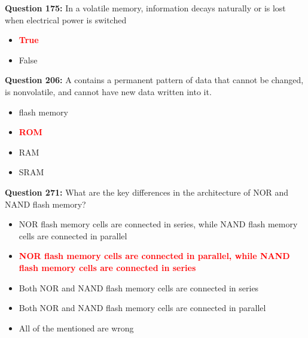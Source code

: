 \documentclass[12pt,a4paper]{article}
\begin{document}
\vspace{0.5cm}

\vspace{0.5cm}

\textbf{Question 175:} In a volatile memory, information decays naturally or is lost when electrical power is switched

\begin{itemize}
    \item[\textbf{A.}] \textcolor{red}{\textbf{True}}
    \item[\textbf{B.}] False
\end{itemize}

\vspace{0.5cm}

\vspace{0.5cm}

\textbf{Question 206:} A \underline{\hspace{1.5cm}} contains a permanent pattern of data that cannot be changed, is nonvolatile, and cannot have new data written into it.

\begin{itemize}
    \item[\textbf{A.}] flash memory
    \item[\textbf{B.}] \textcolor{red}{\textbf{ROM}}
    \item[\textbf{C.}] RAM
    \item[\textbf{D.}] SRAM
\end{itemize}

\vspace{0.5cm}

\vspace{0.5cm}

\vspace{0.5cm}

\vspace{0.5cm}

\vspace{0.5cm}

\vspace{0.5cm}

\textbf{Question 271:} What are the key differences in the architecture of NOR and NAND flash memory?

\begin{itemize}
    \item[\textbf{A.}] NOR flash memory cells are connected in series, while NAND flash memory cells are connected in parallel
    \item[\textbf{B.}] \textcolor{red}{\textbf{NOR flash memory cells are connected in parallel, while NAND flash memory cells are connected in series}}
    \item[\textbf{C.}] Both NOR and NAND flash memory cells are connected in series
    \item[\textbf{D.}] Both NOR and NAND flash memory cells are connected in parallel
    \item[\textbf{E.}] All of the mentioned are wrong
\end{itemize}
\end{document}
